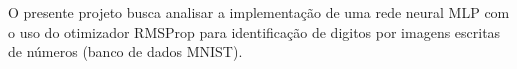\begin{resumo}
O presente projeto busca analisar a implementação de uma rede neural MLP com o uso do otimizador RMSProp para identificação de digitos por imagens escritas de números (banco de dados MNIST).
\end{resumo}